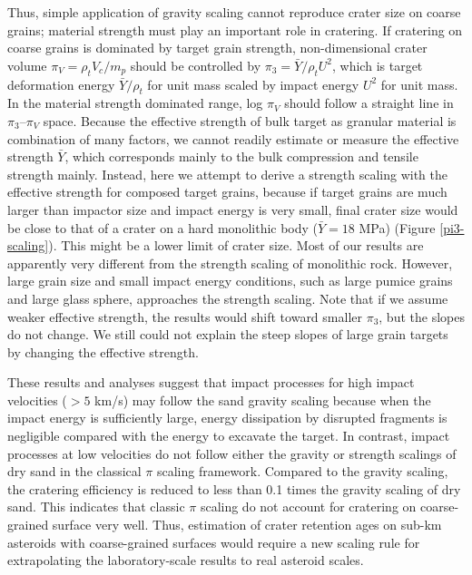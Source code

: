 \documentclass[3p,authoryear]{elsarticle}
\newcommand{\red}[1]{\textcolor{red}{#1}}
\begin{document}
Thus, simple application of gravity scaling cannot reproduce crater size on coarse grains; material strength must play an important role in cratering.
If cratering on coarse grains is dominated by target grain strength, non-dimensional crater volume $\pi_V=\rho_t V_c/m_p$ should be controlled by $\pi_3=\bar{Y}/ \rho_t U^2$, which is target deformation energy $\bar{Y}/\rho_t$ for unit mass scaled by impact energy $U^2$ for unit mass.
In the material strength dominated range, log $\pi_V$ should follow a straight line in $\pi_3$--$\pi_V$ space.
Because the effective strength of bulk target as granular material is combination of many factors, we cannot readily estimate or measure the effective strength $\bar{Y}$, which corresponds mainly to the bulk compression and tensile strength mainly.
Instead, here we attempt to derive a strength scaling with the effective strength for composed target grains, because if target grains are much larger than impactor size and impact energy is very small, final crater size would be close to that of a crater on a hard monolithic body ($\bar{Y}=18$ MPa) (Figure \ref{pi3-scaling}).
This might be a lower limit of crater size.
Most of our results are apparently very different from the strength scaling of monolithic rock. However, large grain size and small impact energy conditions, such as large pumice grains and large glass sphere, approaches the strength scaling.
Note that if we assume weaker effective strength, the results would shift toward smaller $\pi_3$, but the slopes do not change.
We still could not explain the steep slopes of large grain targets by changing the effective strength.

These results and analyses suggest that impact processes for high impact velocities ($> 5$ km/s) may follow the sand gravity scaling because when the impact energy is sufficiently large, energy dissipation by disrupted fragments is negligible compared with the energy to excavate the target.
In contrast, impact processes at low velocities do not follow either the gravity or strength scalings of dry sand in the classical $\pi$ scaling framework.
Compared to the gravity scaling, the cratering efficiency is reduced to less than 0.1 times the gravity scaling of dry sand.
This indicates that classic $\pi$ scaling do not account for cratering on coarse-grained surface very well. Thus, estimation of crater retention ages on sub-km asteroids with coarse-grained surfaces would require a new scaling rule for extrapolating the laboratory-scale results to real asteroid scales.
\end{document}
